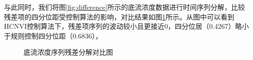 与此同时，我们将图\ref{fig:difference}所示的底流浓度数据进行时间序列分解，比较残差项的四分位距受控制算法的影响，对比结果如图\ref{fig:decompose}所示。从图中可以看到HCNVI控制算法下，残差项序列的波动较小且更接近0，四分位居（0.4267）略小于规则控制四分位距（0.6836），
\begin{figure}[htb]
  \centering
  \caption{底流浓度序列残差分解对比图}
  \label{fig:decompose}
\end{figure}

